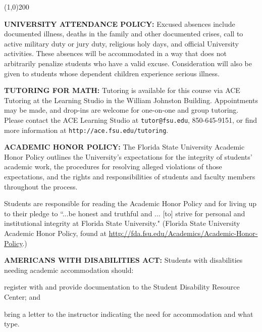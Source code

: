 \documentclass[12pt,oneside]{amsart}
\begin{document}
\vspace{-4.5mm}
\begin{center}
	\line(1,0){200}
\end{center}
\vspace{-1.75mm}

\noindent \textbf{UNIVERSITY ATTENDANCE POLICY:} Excused absences include documented illness, deaths in the family and other documented crises, call to active military duty or jury duty, religious holy days, and official University activities. These absences will be accommodated in a way that does not arbitrarily penalize students who have a valid excuse. Consideration will also be given to students whose dependent children experience serious illness.

\noindent \textbf{TUTORING FOR MATH:} Tutoring is available for this course via ACE Tutoring at the Learning Studio in the William Johnston Building.  Appointments may be made, and drop-ins are welcome for one-on-one and group tutoring.  Please contact the ACE Learning Studio at \texttt{tutor@fsu.edu}, 850-645-9151, or find more information at \texttt{http://ace.fsu.edu/tutoring}.

\noindent \textbf{ACADEMIC HONOR POLICY:} The Florida State University Academic Honor Policy outlines the University's expectations for the integrity of students' academic work, the procedures for resolving alleged violations of those expectations, and the rights and responsibilities of students and faculty members throughout the process. \vspace{-3mm}

Students are responsible for reading the Academic Honor Policy and for living up to their pledge to ``...be honest and truthful and ... [to] strive for personal and institutional integrity at Florida State University." (Florida State University Academic Honor Policy, found at \url{http://fda.fsu.edu/Academics/Academic-Honor-Policy}.)

\noindent \textbf{AMERICANS WITH DISABILITIES ACT:} Students with disabilities needing academic accommodation should: \begin{enumerate*}[label=(\arabic*), topsep=1.5mm, itemsep=1.5mm]\item register with and provide documentation to the Student Disability Resource Center; and \item bring a letter to the instructor indicating the need for accommodation and what type.\end{enumerate*}\vspace{-3mm}
\end{document}
